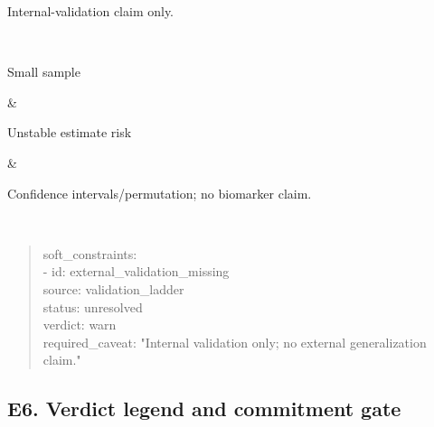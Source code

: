 {\begin{longtable}
\begin{minipage}[t]{\linewidth}
Internal-validation claim only.
\end{minipage} \\
\hline
\begin{minipage}[t]{\linewidth}\RaggedRight\hspace{0pt}
Small sample
\end{minipage} & \begin{minipage}[t]{\linewidth}\RaggedRight\hspace{0pt}
Unstable estimate risk
\end{minipage} & \begin{minipage}[t]{\linewidth}\RaggedRight\hspace{0pt}
Confidence intervals/\allowbreak{}permutation; no biomarker claim.
\end{minipage} \\
\end{longtable}
}

\begin{quote}
soft\_\allowbreak{}constraints:\\
- id: external\_\allowbreak{}validation\_\allowbreak{}missing\\
source: validation\_\allowbreak{}ladder\\
status: unresolved\\
verdict: warn\\
required\_\allowbreak{}caveat: "Internal validation only; no external generalization claim."
\end{quote}

\subsection{\texorpdfstring{\textbf{E6. Verdict legend and commitment gate}}{E6. Verdict legend and commitment gate}}\label{e6.-verdict-legend-and-commitment-gate}

